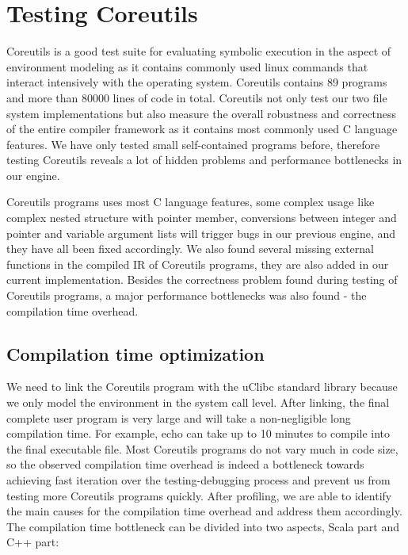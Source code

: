 \documentclass[sigplan, nonacm]{acmart}\settopmatter{printfolios=true,printccs=false,printacmref=false}
\begin{document}
\section{Testing Coreutils}\label{coreutilstests}
Coreutils is a good test suite for evaluating symbolic execution in the aspect of environment modeling as it contains commonly used linux commands that interact intensively with  the operating system. Coreutils contains 89 programs and more than 80000 lines of code in total. Coreutils not only test our two file system implementations but also measure the overall robustness and correctness of the entire compiler framework as it contains most commonly used C language features. We have only tested small self-contained programs before, therefore testing Coreutils reveals a lot of hidden problems and performance bottlenecks in our engine.\par
Coreutils programs uses most C language features, some complex usage like complex nested structure with pointer member, conversions between integer and pointer and variable argument lists will trigger bugs in our previous engine, and they have all been fixed accordingly. We also found several missing external functions in the compiled IR of Coreutils programs, they are also added in our current implementation. Besides the correctness problem found during testing of Coreutils programs, a major performance bottlenecks was also found - the compilation time overhead.
\subsection{Compilation time optimization}
We need to link the Coreutils program with the uClibc \cite{uclibcweb} standard library because we only model the environment in the system call level. After linking, the final complete user program is very large and will take a non-negligible long compilation time. For example, echo can take up to 10 minutes to compile into the final executable file. Most Coreutils programs do not vary much in code size, so the observed compilation time overhead is indeed a bottleneck towards achieving fast iteration over the testing-debugging process and prevent us from testing more Coreutils programs quickly. After profiling, we are able to identify the main causes for the compilation time overhead and address them accordingly. The compilation time bottleneck can be divided into two aspects, Scala part and C++ part:
\end{document}
